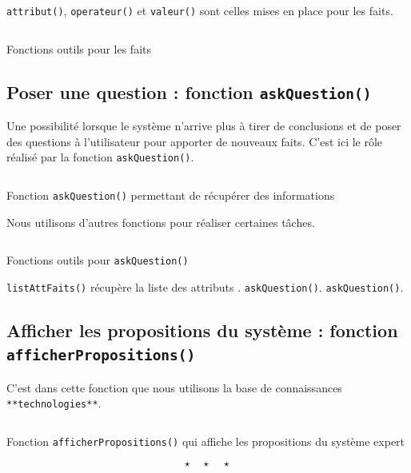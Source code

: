 \documentclass[a4paper,12pt]{article}
\begin{document}
\texttt{attribut()}, \texttt{operateur()} et \texttt{valeur()} sont celles mises en place pour les faits.

\begin{listing}[H]
	\centering
	\inputminted[breaklines=true,linenos]{lisp}{../fonctionsOutilsFaits.lisp}
	\caption{Fonctions outils pour les faits}
\end{listing}

\subsection{Poser une question : fonction \texttt{askQuestion()}}

Une possibilité lorsque le système n'arrive plus à tirer de conclusions et de poser des questions à l'utilisateur pour apporter de nouveaux faits. C'est ici le rôle réalisé par la fonction \texttt{askQuestion()}.

\begin{listing}[H]
	\centering
	\inputminted[breaklines=true,linenos, firstline = 15]{lisp}{../askQuestion.lisp}
	\caption{Fonction \texttt{askQuestion()} permettant de récupérer des informations}
\end{listing}

Nous utilisons d'autres fonctions pour réaliser certaines tâches.

\begin{listing}[H]
	\centering
	\inputminted[breaklines=true,linenos, lastline = 13]{lisp}{../askQuestion.lisp}
	\caption{Fonctions outils pour \texttt{askQuestion()}}
\end{listing}

\texttt{listAttFaits()} récupère la liste des attributs .
\texttt{askQuestion()}.
\texttt{askQuestion()}.


\subsection{Afficher les propositions du système : fonction \texttt{afficherPropositions()}}

	C'est dans cette fonction que nous utilisons la base de connaissances \texttt{**technologies**}.

\begin{listing}[H]
	\centering
	\inputminted[breaklines=true,linenos]{lisp}{../afficherPropositions.lisp}
	\caption{Fonction \texttt{afficherPropositions()} qui affiche les propositions du système expert}
\end{listing}


\[ \star \quad \star \quad \star \]
\newpage

\end{document}
